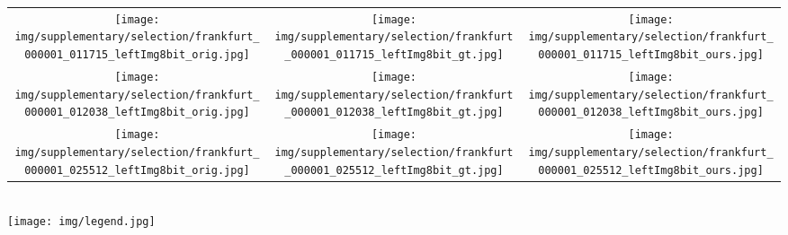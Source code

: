 \documentclass[runningheads]{llncs}
\newcommand{\ours}{Drive$\&$Segment\xspace}
\begin{document}
\begin{figure*}[t!]
\begin{minipage}[t]{\columnwidth}
\begin{tabular}{c@{}c@{}c}
         \vspace{-3pt}
         \texttt{[image: img/supplementary/selection/frankfurt\_000001\_011715\_leftImg8bit\_orig.jpg]} &
         \texttt{[image: img/supplementary/selection/frankfurt\_000001\_011715\_leftImg8bit\_gt.jpg]} &
         \texttt{[image: img/supplementary/selection/frankfurt\_000001\_011715\_leftImg8bit\_ours.jpg]} \\
         \vspace{-3pt}
         \texttt{[image: img/supplementary/selection/frankfurt\_000001\_012038\_leftImg8bit\_orig.jpg]} &
         \texttt{[image: img/supplementary/selection/frankfurt\_000001\_012038\_leftImg8bit\_gt.jpg]} &
         \texttt{[image: img/supplementary/selection/frankfurt\_000001\_012038\_leftImg8bit\_ours.jpg]} \\
         \vspace{-3pt}
         \texttt{[image: img/supplementary/selection/frankfurt\_000001\_025512\_leftImg8bit\_orig.jpg]} &
         \texttt{[image: img/supplementary/selection/frankfurt\_000001\_025512\_leftImg8bit\_gt.jpg]} &
         \texttt{[image: img/supplementary/selection/frankfurt\_000001\_025512\_leftImg8bit\_ours.jpg]} \\
         \end{tabular}
    \end{minipage}\\
    \texttt{[image: img/legend.jpg]}
    \vspace*{-2ex}
    \caption{
    \textbf{Qualitative results for unsupervised semantic segmentation using our \ours approach on the validation split of the Cityscapes dataset.} The matching
between our pseudo-classes and the set of ground-truth classes is obtained using the Hungarian algorithm.
    }
    \label{fig:qualitative_supp2}
    \vspace{-1ex}
\end{figure*}
\end{document}
